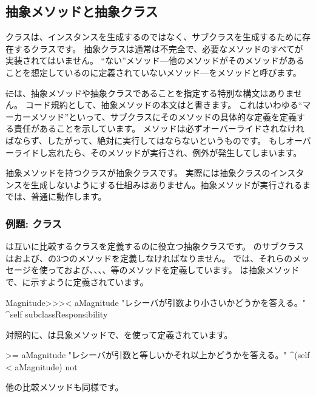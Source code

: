 \documentclass[a4paper,10pt,twoside]{book}
\begin{document}
\subsection{抽象メソッドと抽象クラス}

クラスは、インスタンスを生成するのではなく、サブクラスを生成するために存在するクラスです。
抽象クラスは通常は不完全で、必要なメソッドのすべてが実装されてはいません。
``ない''メソッド---他のメソッドがそのメソッドがあることを想定しているのに定義されていないメソッド---をメソッドと呼びます。

\st には、抽象メソッドや抽象クラスであることを指定する特別な構文はありません。
コード規約として、抽象メソッドの本文は\mbox{}と書きます。
これはいわゆる``マーカーメソッド''といって、サブクラスにそのメソッドの具体的な定義を定義する責任があることを示しています。
メソッドは必ずオーバーライドされなければならず、したがって、絶対に実行してはならないというものです。
もしオーバーライドし忘れたら、そのメソッドが実行され、例外が発生してしまいます。

抽象メソッドを持つクラスが抽象クラスです。
実際には抽象クラスのインスタンスを生成しないようにする仕組みはありません。抽象メソッドが実行されるまでは、普通に動作します。

\subsubsection{例題: クラス}
は互いに比較するクラスを定義するのに役立つ抽象クラスです。
のサブクラスは\ct{<}および\ct{=}、の3つのメソッドを定義しなければなりません。
では、それらのメッセージを使って\ct{>}および\ct{>=}、\ct{<=}、、、等のメソッドを定義しています。
は抽象メソッドで、に示すように定義されています。

\begin{method}[MagnitudeLessThan]{}
Magnitude>>>< aMagnitude 
	"レシーバが引数より小さいかどうかを答える。"
	^self subclassResponsibility
\end{method}

\noindent
対照的に、は具象メソッドで、\ct{<}を使って定義されています。

\begin{method}[Magnitude>=]{}
>= aMagnitude 
	"レシーバが引数と等しいかそれ以上かどうかを答える。"
	^(self < aMagnitude) not
\end{method}
他の比較メソッドも同様です。
\end{document}
